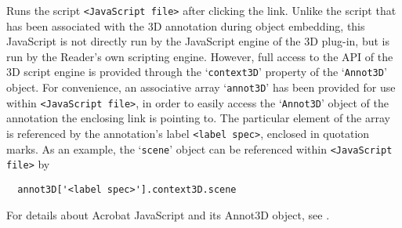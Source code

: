 \documentclass[a4paper]{article}
\begin{document}
Runs the script \verb+<JavaScript file>+ after clicking the link. Unlike the script that has been associated with the 3D annotation during object embedding, this JavaScript is not directly run by the JavaScript engine of the 3D plug-in, but is run by the Reader's own scripting engine. However, full access to the API of the 3D script engine is provided through the `\verb+context3D+' property of the `\verb+Annot3D+' object. For convenience, an associative array `\verb+annot3D+' has been provided for use within \verb+<JavaScript file>+, in order to easily access the `\verb+Annot3D+' object of the annotation the enclosing link is pointing to. The particular element of the array is referenced by the annotation's label \verb+<label spec>+, enclosed in quotation marks. As an example, the `\verb+scene+' object can be referenced within \verb+<JavaScript file>+ by
\begin{verbatim}
  annot3D['<label spec>'].context3D.scene
\end{verbatim}
For details about Acrobat JavaScript and its Annot3D object, see \cite{jscript}.

\end{document}
